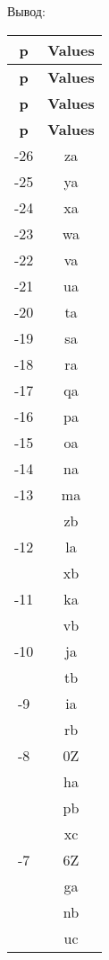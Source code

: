 \documentclass[11pt,a4paper]{scrarticle}
\theoremstyle{definition}
\begin{document}
Вывод:
\begin{longtable}{|c|c|}
    \hline
    \textbf{p} & \textbf{Values} \\
    \hline
    \endfirsthead
    \hline
    \textbf{p} & \textbf{Values} \\
    \hline
    \endhead
    \hline
    \textbf{p} & \textbf{Values} \\
    \hline
    \endfirsthead
    \hline
    \textbf{p} & \textbf{Values} \\
    \hline
    \endhead
    -26        & za              \\
    \hline
    -25        & ya              \\
    \hline
    -24        & xa              \\
    \hline
    -23        & wa              \\
    \hline
    -22        & va              \\
    \hline
    -21        & ua              \\
    \hline
    -20        & ta              \\
    \hline
    -19        & sa              \\
    \hline
    -18        & ra              \\
    \hline
    -17        & qa              \\
    \hline
    -16        & pa              \\
    \hline
    -15        & oa              \\
    \hline
    -14        & na              \\
    \hline
    -13        & ma              \\ & zb \\
    \hline
    -12        & la              \\ & xb \\
    \hline
    -11        & ka              \\ & vb \\
    \hline
    -10        & ja              \\ & tb \\
    \hline
    -9         & ia              \\ & rb \\
    \hline
    -8         & 0Z              \\ & ha \\ & pb \\ & xc \\
    \hline
    -7         & 6Z              \\ & ga \\ & nb \\ & uc \\

\end{longtable}
\end{document}

